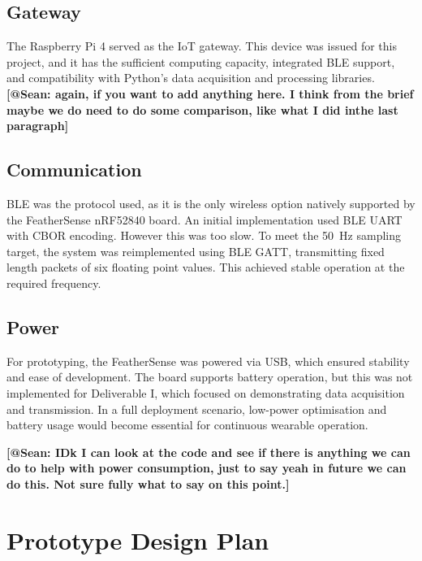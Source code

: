 \documentclass[conference]{lib/IEEEtran}
\begin{document}
\subsection{Gateway}\label{GW}
The Raspberry Pi 4 served as the IoT gateway. This device was issued for this project, and it has the sufficient computing capacity, integrated BLE support, and compatibility with Python's data acquisition and processing libraries. 
\textbf{[@Sean: again, if you want to add anything here. I think from the brief maybe we do need to do some comparison, like what I did inthe last paragraph]} 

\subsection{Communication}\label{COM}
BLE was the protocol used, as it is the only wireless option natively supported by the FeatherSense nRF52840 board. An initial implementation used BLE UART with CBOR encoding. However this was too slow. To meet the 50~Hz sampling target, the system was reimplemented using BLE GATT, transmitting fixed length packets of six floating point values. This achieved stable operation at the required frequency.

\subsection{Power}
For prototyping, the FeatherSense was powered via USB, which ensured stability and ease of development. The board supports battery operation, but this was not implemented for Deliverable I, which focused on demonstrating data acquisition and transmission. In a full deployment scenario, low-power optimisation and battery usage would become essential for continuous wearable operation.

\textbf{[@Sean: IDk I can look at the code and see if there is anything we can do to help with power consumption, just to say yeah in future we can do this. Not sure fully what to say on this point.]} 



\section{Prototype Design Plan}
\end{document}
